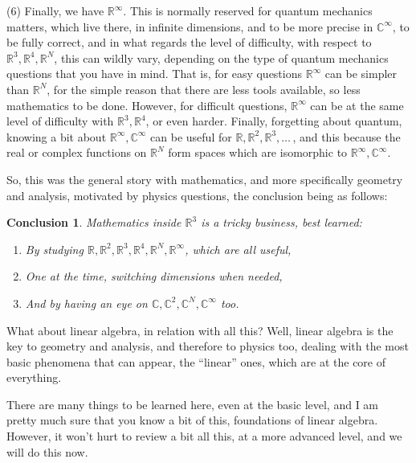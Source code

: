 \documentclass[12pt]{amsbook}
\newtheorem{conclusion}[theorem]{Conclusion}
\begin{document}
\bigskip

(6) Finally, we have $\mathbb R^\infty$. This is normally reserved for quantum mechanics matters, which live there, in infinite dimensions, and to be more precise in $\mathbb C^\infty$, to be fully correct, and in what regards the level of difficulty, with respect to $\mathbb R^3,\mathbb R^4,\mathbb R^N$, this can wildly vary, depending on the type of quantum mechanics questions that you have in mind. That is, for easy questions $\mathbb R^\infty$ can be simpler than $\mathbb R^N$, for the simple reason that there are less tools available, so less mathematics to be done. However, for difficult questions, $\mathbb R^\infty$ can be at the same level of difficulty with $\mathbb R^3,\mathbb R^4$, or even harder. Finally, forgetting about quantum, knowing a bit about $\mathbb R^\infty,\mathbb C^\infty$ can be useful for $\mathbb R,\mathbb R^2,\mathbb R^3,\ldots\,$, and this because the real or complex functions on $\mathbb R^N$ form spaces which are isomorphic to $\mathbb R^\infty,\mathbb C^\infty$.

\bigskip

So, this was the general story with mathematics, and more specifically geometry and analysis, motivated by physics questions, the conclusion being as follows:

\begin{conclusion}
Mathematics inside $\mathbb R^3$ is a tricky business, best learned:
\begin{enumerate}
\item By studying $\mathbb R,\mathbb R^2,\mathbb R^3,\mathbb R^4,\mathbb R^N,\mathbb R^\infty$, which are all useful,

\item One at the time, switching dimensions when needed,

\item And by having an eye on $\mathbb C,\mathbb C^2,\mathbb C^N,\mathbb C^\infty$ too.
\end{enumerate}
\end{conclusion}

What about linear algebra, in relation with all this? Well, linear algebra is the key to geometry and analysis, and therefore to physics too, dealing with the most basic phenomena that can appear, the ``linear'' ones, which are at the core of everything.

\bigskip

There are many things to be learned here, even at the basic level, and I am pretty much sure that you know a bit of this, foundations of linear algebra. However, it won't hurt to review a bit all this, at a more advanced level, and we will do this now. 
\end{document}
